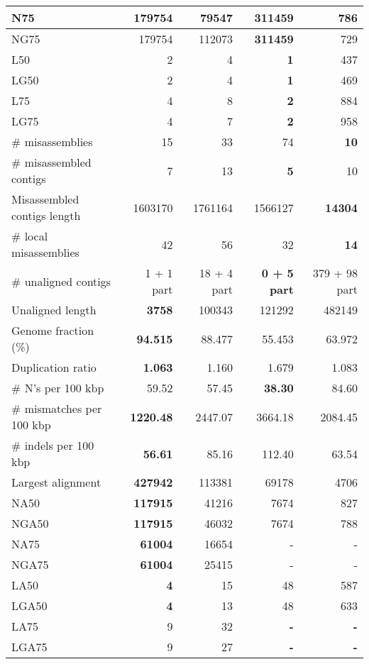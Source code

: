 \documentclass[12pt,a4paper]{article}
\begin{document}
\begin{table}[ht]
\begin{center}
\begin{tabular}{|l*{4}{|r}|}
N75 & 179754 & 79547 & {\bf 311459} & 786 \\ \hline
NG75 & 179754 & 112073 & {\bf 311459} & 729 \\ \hline
L50 & 2 & 4 & {\bf 1} & 437 \\ \hline
LG50 & 2 & 4 & {\bf 1} & 469 \\ \hline
L75 & 4 & 8 & {\bf 2} & 884 \\ \hline
LG75 & 4 & 7 & {\bf 2} & 958 \\ \hline
\# misassemblies & 15 & 33 & 74 & {\bf 10} \\ \hline
\# misassembled contigs & 7 & 13 & {\bf 5} & 10 \\ \hline
Misassembled contigs length & 1603170 & 1761164 & 1566127 & {\bf 14304} \\ \hline
\# local misassemblies & 42 & 56 & 32 & {\bf 14} \\ \hline
\# unaligned contigs & 1 + 1 part & 18 + 4 part & {\bf 0 + 5 part} & 379 + 98 part \\ \hline
Unaligned length & {\bf 3758} & 100343 & 121292 & 482149 \\ \hline
Genome fraction (\%) & {\bf 94.515} & 88.477 & 55.453 & 63.972 \\ \hline
Duplication ratio & {\bf 1.063} & 1.160 & 1.679 & 1.083 \\ \hline
\# N's per 100 kbp & 59.52 & 57.45 & {\bf 38.30} & 84.60 \\ \hline
\# mismatches per 100 kbp & {\bf 1220.48} & 2447.07 & 3664.18 & 2084.45 \\ \hline
\# indels per 100 kbp & {\bf 56.61} & 85.16 & 112.40 & 63.54 \\ \hline
Largest alignment & {\bf 427942} & 113381 & 69178 & 4706 \\ \hline
NA50 & {\bf 117915} & 41216 & 7674 & 827 \\ \hline
NGA50 & {\bf 117915} & 46032 & 7674 & 788 \\ \hline
NA75 & {\bf 61004} & 16654 & - & - \\ \hline
NGA75 & {\bf 61004} & 25415 & - & - \\ \hline
LA50 & {\bf 4} & 15 & 48 & 587 \\ \hline
LGA50 & {\bf 4} & 13 & 48 & 633 \\ \hline
LA75 & 9 & 32 & {\bf -} & {\bf -} \\ \hline
LGA75 & 9 & 27 & {\bf -} & {\bf -} \\ \hline
\end{tabular}
\end{center}
\end{table}
\end{document}
